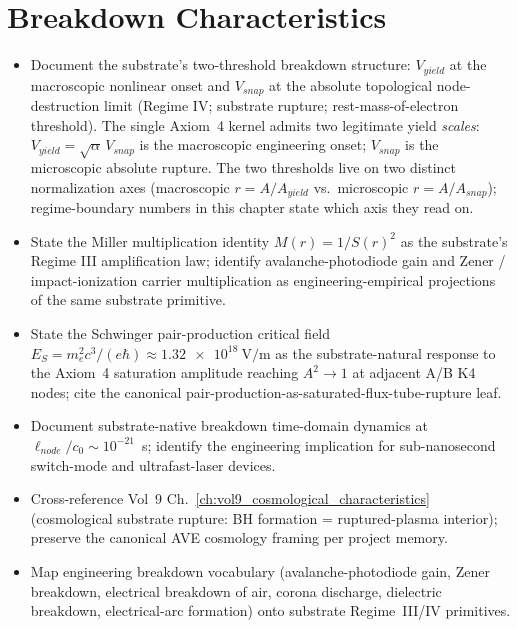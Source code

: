 \chapter{Breakdown Characteristics}
\label{ch:vol9_breakdown_characteristics}

\begin{objectivebox}
\begin{itemize}
    \item Document the substrate's two-threshold breakdown structure: $V_{yield}$ at the macroscopic nonlinear onset and $V_{snap}$ at the absolute topological node-destruction limit (Regime IV; substrate rupture; rest-mass-of-electron threshold). The single Axiom~4 kernel admits two legitimate yield \emph{scales}: $V_{yield} = \sqrt{\alpha}\,V_{snap}$ is the macroscopic engineering onset; $V_{snap}$ is the microscopic absolute rupture. The two thresholds live on two distinct normalization axes (macroscopic $r = A/A_{yield}$ vs.\ microscopic $r = A/A_{snap}$); regime-boundary numbers in this chapter state which axis they read on.
    \item State the Miller multiplication identity $M(r) = 1/S(r)^2$ as the substrate's Regime III amplification law; identify avalanche-photodiode gain and Zener / impact-ionization carrier multiplication as engineering-empirical projections of the same substrate primitive.
    \item State the Schwinger pair-production critical field $E_S = m_e^2 c^3/(e\hbar) \approx \qty{1.32e18}{\volt\per\metre}$ as the substrate-natural response to the Axiom~4 saturation amplitude reaching $A^2 \to 1$ at adjacent A/B K4 nodes; cite the canonical pair-production-as-saturated-flux-tube-rupture leaf.
    \item Document substrate-native breakdown time-domain dynamics at $\ell_{node}/c_0 \sim 10^{-21}$~s; identify the engineering implication for sub-nanosecond switch-mode and ultrafast-laser devices.
    \item Cross-reference Vol~9 Ch.~\ref{ch:vol9_cosmological_characteristics} (cosmological substrate rupture: BH formation = ruptured-plasma interior); preserve the canonical AVE cosmology framing per project memory.
    \item Map engineering breakdown vocabulary (avalanche-photodiode gain, Zener breakdown, electrical breakdown of air, corona discharge, dielectric breakdown, electrical-arc formation) onto substrate Regime~III/IV primitives.
\end{itemize}
\end{objectivebox}

